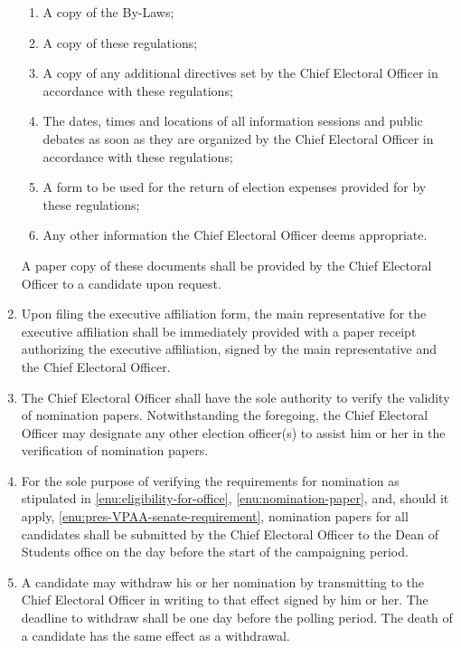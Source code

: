 \documentclass[oneside]{book}
\begin{document}
\begin{enumerate}
\begin{enumerate}
\item A copy of the By-Laws;
\item A copy of these regulations;
\item A copy of any additional directives set by the Chief Electoral Officer
in accordance with these regulations;
\item The dates, times and locations of all information sessions and public
debates as soon as they are organized by the Chief Electoral Officer
in accordance with these regulations;
\item \label{enu:expense-return-form}A form to be used for the return of
election expenses provided for by these regulations;
\item Any other information the Chief Electoral Officer deems appropriate.
\end{enumerate}
A paper copy of these documents shall be provided by the Chief
Electoral Officer to a candidate upon request. 
\item Upon filing the executive affiliation form, the main representative
for the executive affiliation shall be immediately provided with a
paper receipt authorizing the executive affiliation, signed by the
main representative and the Chief Electoral Officer. 
\item \label{enu:verification-by-ceo}The Chief Electoral Officer shall
have the sole authority to verify the validity of nomination papers.
Notwithstanding the foregoing, the Chief Electoral Officer may designate
any other election officer(s) to assist him or her in the verification
of nomination papers. 
\item \label{enu:verification-by-DoS}For the sole purpose of verifying
the requirements for nomination as stipulated in \autoref{enu:eligibility-for-office},
\autoref{enu:nomination-paper}, and, should it apply, \autoref{enu:pres-VPAA-senate-requirement},
nomination papers for all candidates shall be submitted by the Chief
Electoral Officer to the Dean of Students office on the day before
the start of the campaigning period. 
\item A candidate may withdraw his or her nomination by transmitting to
the Chief Electoral Officer in writing to that effect signed by him
or her. The deadline to withdraw shall be one day before the polling
period. The death of a candidate has the same effect as a withdrawal. 


\end{enumerate}
\end{document}
